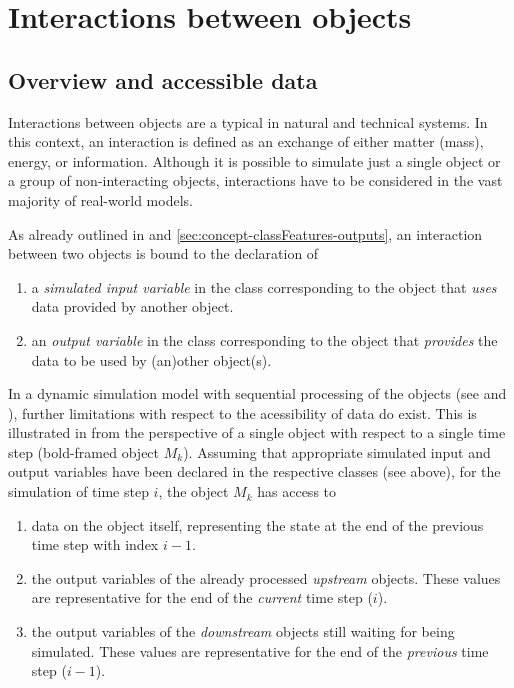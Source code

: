 
\section{Interactions between objects} \label{sec:concept-interactions}


\subsection{Overview and accessible data} \label{sec:concept-interactions-access}

Interactions  between objects are a typical in natural and technical systems. In this context, an interaction is defined as an exchange of either matter (mass), energy, or information. Although it is possible to simulate just a single object or a group of non-interacting objects, interactions have to be considered in the vast majority of real-world models.

As already outlined in  and \ref{sec:concept-classFeatures-outputs}, an interaction between two objects is bound to the declaration of
\begin{enumerate}
  \item a \emph{simulated input variable} in the class corresponding to the object that \emph{uses} data provided by another object.
  \item an \emph{output variable} in the class corresponding to the object that \emph{provides} the data to be used by (an)other object(s).
\end{enumerate}

In a dynamic simulation model with sequential processing of the objects (see  and ), further limitations with respect to the acessibility of data do exist. This is illustrated in  from the perspective of a single object with respect to a single time step (bold-framed object $M_k$). Assuming that appropriate simulated input and output variables have been declared in the respective classes (see above), for the simulation of time step $i$, the object $M_k$ has access to
\begin{enumerate}
  \item data on the object itself, representing the state at the end of the previous time step with index $i-1$.
  \item the output variables of the already processed \emph{upstream} objects. These values are representative for the end of the \emph{current} time step ($i$).
  \item the output variables of the \emph{downstream} objects still waiting for being simulated. These values are representative for the end of the \emph{previous} time step ($i-1$).
\end{enumerate}

